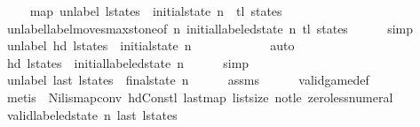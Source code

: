\begin{isabellebody}
\ \ \isamarkupfalse%
\ {\isacharasterisk}{\isacharcolon}\ {\isachardoublequoteopen}map\ unlabel\ {\isacharquery}l{\isacharunderscore}states\ {\isacharequal}\ {\isacharparenleft}initial{\isacharunderscore}state\ n{\isacharparenright}\ {\isacharhash}\ tl\ states{\isachardoublequoteclose}\isanewline
\ \ \ \ \isamarkupfalse%
\ unlabel{\isacharunderscore}label{\isacharunderscore}moves{\isacharunderscore}max{\isacharunderscore}stone{\isacharbrackleft}of\ n\ {\isachardoublequoteopen}initial{\isacharunderscore}labeled{\isacharunderscore}state\ n{\isachardoublequoteclose}\ {\isachardoublequoteopen}tl\ states{\isachardoublequoteclose}{\isacharbrackright}\isanewline
\ \ \ \ \isamarkupfalse%
\ simp\isanewline
\isanewline
\ \ \isamarkupfalse%
\ {\isachardoublequoteopen}unlabel\ {\isacharparenleft}hd\ {\isacharquery}l{\isacharunderscore}states{\isacharparenright}\ {\isacharequal}\ initial{\isacharunderscore}state\ n{\isachardoublequoteclose}\isanewline
\ \ \ \ \isamarkupfalse%
\ {\isacharasterisk}\isanewline
\ \ \ \ \isamarkupfalse%
\ auto\isanewline
\ \ \isamarkupfalse%
\ {\isachardoublequoteopen}hd\ {\isacharquery}l{\isacharunderscore}states\ {\isacharequal}\ initial{\isacharunderscore}labeled{\isacharunderscore}state\ n{\isachardoublequoteclose}\isanewline
\ \ \ \ \isamarkupfalse%
\ simp\isanewline
\isanewline
\ \ \isamarkupfalse%
\ {\isachardoublequoteopen}unlabel\ {\isacharparenleft}last\ {\isacharquery}l{\isacharunderscore}states{\isacharparenright}\ {\isacharequal}\ final{\isacharunderscore}state\ n{\isachardoublequoteclose}\isanewline
\ \ \ \ \isamarkupfalse%
\ assms\isanewline
\ \ \ \ \isamarkupfalse%
\ valid{\isacharunderscore}game{\isacharunderscore}def\isanewline
\ \ \ \ \isamarkupfalse%
\ {\isacharparenleft}metis\ {\isachardoublequoteopen}{\isacharasterisk}{\isachardoublequoteclose}\ Nil{\isacharunderscore}is{\isacharunderscore}map{\isacharunderscore}conv\ hd{\isacharunderscore}Cons{\isacharunderscore}tl\ last{\isacharunderscore}map\ list{\isachardot}size{\isacharparenleft}{}{\isacharparenright}\ not{\isacharunderscore}le\ zero{\isacharunderscore}less{\isacharunderscore}numeral{\isacharparenright}\isanewline
\ \ \isamarkupfalse%
\isanewline
\ \ \isamarkupfalse%
\ {\isachardoublequoteopen}valid{\isacharunderscore}labeled{\isacharunderscore}state\ n\ {\isacharparenleft}last\ {\isacharquery}l{\isacharunderscore}states{\isacharparenright}{\isachardoublequoteclose}\isanewline

\end{isabellebody}
